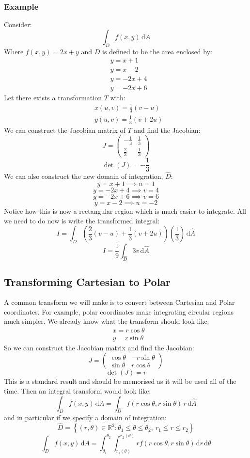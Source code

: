 \documentclass[12pt]{article}
\begin{document}
\subsubsection*{Example}
Consider:
\[\int_Df(x,y)\,\text{d}A\]
Where \(f(x,y)=2x+y\) and \(D\) is defined to be the area enclosed by:
\begin{align*}
    &y=x+1 \\
    &y=x-2 \\
    &y=-2x+4 \\
    &y=-2x+6
\end{align*}
Let there exists a transformation \(T\) with:
\begin{align*}
    &x(u,v)=\frac{1}{3}(v-u) \\
    &y(u,v)=\frac{1}{3}(v+2u)
\end{align*}
We can construct the Jacobian matrix of \(T\) and find the Jacobian:
\[J=\begin{pmatrix}
    -\frac{1}{3} & \frac{1}{3} \\
    \frac{2}{3} & \frac{1}{3}
\end{pmatrix}\]
\[\det(J)=-\frac{1}{3}\]
We can also construct the new domain of integration, \(\hat{D}\):
\[y=x+1\implies u=1\]
\[y=-2x+4\implies v=4\]
\[y=-2x+6\implies v=6\]
\[y=x-2\implies u=-2\]
Notice how this is now a rectangular region which is much easier to integrate. All we need to do now is write the transformed integral:
\[I=\int_{\hat{D}}\left(\frac{2}{3}(v-u)+\frac{1}{3}(v+2u)\right)\left(\frac{1}{3}\right)\,\text{d}\hat{A}\]
\[I=\frac{1}{9}\int_{\hat{D}} 3v\,\text{d}\hat{A}\]
\subsection*{Transforming Cartesian to Polar}
A common transform we will make is to convert between Cartesian and Polar coordinates. For example, polar coordinates make integrating circular regions much simpler. We already know what the transform should look like:
\begin{align*}
    &x=r\cos\theta \\
    &y=r\sin \theta
\end{align*}
So we can construct the Jacobian matrix and find the Jacobian:
\[J=\begin{pmatrix}
    \cos\theta & -r\sin\theta \\
    \sin\theta & r\cos\theta
\end{pmatrix}\]
\[\det(J)=r\]
This is a standard result and should be memorised as it will be used all of the time. Then an integral transform would look like:
\[\int_D f(x,y)\,\text{d}A=\int_{\hat{D}} f(r\cos\theta,r\sin\theta)\,r\,\text{d}\hat{A}\]
and in particular if we specify a domain of integration:
\[\hat{D}=\left\{(r,\theta)\in\mathbb{R}^2:\theta_1\leq\theta\leq\theta_2,\ r_1\leq r\leq r_2\right\}\]
\[\int_D f(x,y)\,\text{d}A=\int^{\theta_2}_{\theta_1}\int^{r_2(\theta)}_{r_1(\theta)}rf(r\cos\theta,r\sin\theta)\,\text{d}r\,\text{d}\theta\]
\end{document}
